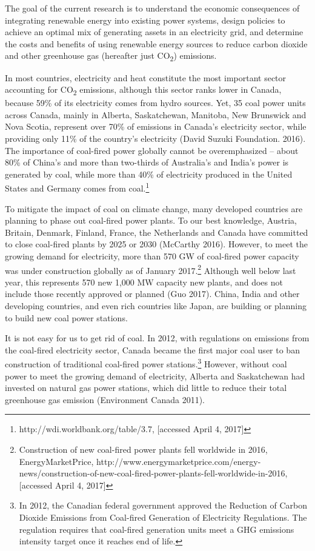 


\label{research-context}

The goal of the current research is to understand the economic
consequences of integrating renewable energy into existing power
systems, design policies to achieve an optimal mix of generating assets
in an electricity grid, and determine the costs and benefits of using
renewable energy sources to reduce carbon dioxide and other greenhouse
gas (hereafter just CO\textsubscript{2}) emissions.

In most countries, electricity and heat constitute the most important
sector accounting for CO\textsubscript{2} emissions, although this
sector ranks lower in Canada, because 59\% of its electricity comes from
hydro sources. Yet, 35 coal power units across Canada, mainly in
Alberta, Saskatchewan, Manitoba, New Brunswick and Nova Scotia,
represent over 70\% of emissions in Canada's electricity sector, while
providing only 11\% of the country's electricity (David Suzuki
Foundation. 2016). The importance of coal-fired power globally cannot be
overemphasized -- about 80\% of China's and more than two-thirds of
Australia's and India's power is generated by coal, while more than 40\%
of electricity produced in the United States and Germany comes from
coal.\footnote{http://wdi.worldbank.org/table/3.7, {[}accessed April 4, 2017{]}}

To mitigate the impact of coal on climate change, many developed
countries are planning to phase out coal-fired power plants. To our best
knowledge, Austria, Britain, Denmark, Finland, France, the Netherlands
and Canada have committed to close coal-fired plants by 2025 or 2030
(McCarthy 2016). However, to meet the growing demand for electricity,
more than 570 GW of coal-fired power capacity was under construction
globally as of January 2017.\footnote{Construction of new coal-fired
	power plants fell worldwide in 2016, EnergyMarketPrice,
	http://www.energymarketprice.com/energy-news/construction-of-new-coal-fired-power-plants-fell-worldwide-in-2016,
	{[}accessed April 4, 2017{]}} Although well below last year, this
represents 570 new 1,000 MW capacity new plants, and does not include
those recently approved or planned (Guo 2017). China, India and other
developing countries, and even rich countries like Japan, are building
or planning to build new coal power stations.

It is not easy for us to get rid of coal. In 2012, with regulations on
emissions from the coal-fired electricity sector, Canada became the
first major coal user to ban construction of traditional coal-fired
power stations.\footnote{In 2012, the Canadian federal government
	approved the Reduction of Carbon Dioxide Emissions from Coal-fired
	Generation of Electricity Regulations. The regulation requires that
	coal-fired generation units meet a GHG emissions intensity target once
	it reaches end of life.} However, without coal power to meet the
growing demand of electricity, Alberta and Saskatchewan had invested on
natural gas power stations, which did little to reduce their total
greenhouse gas emission (Environment Canada 2011).

